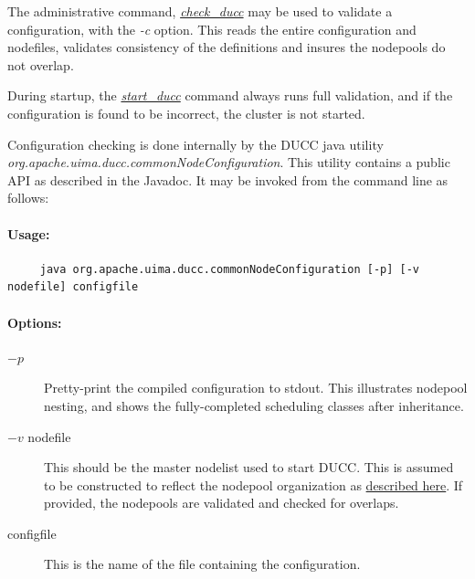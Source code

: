The administrative command, \hyperref[subsec:admin.check-ducc]{\em check\_ducc} may be used to
validate a configuration, with the {\em -c} option.  This reads the entire configuration and
nodefiles, validates consistency of the definitions and insures the nodepools do not overlap.

During startup, the \hyperref[subsec:admin.check-ducc]{\em start\_ducc} command always runs full validation, and if the
configuration is found to be incorrect, the cluster is not started.

Configuration checking is done internally by the DUCC java utility {\em
  org.apache.uima.ducc.commonNodeConfiguration}.  This utility contains a public
API as described in the Javadoc.  It may be invoked from the command line as follows:

    \paragraph{Usage:}
\begin{verbatim}
     java org.apache.uima.ducc.commonNodeConfiguration [-p] [-v nodefile] configfile
\end{verbatim}

    \paragraph{Options:}
    \begin{description}

      \item[$-p$] Pretty-print the compiled configuration to stdout. This illustrates
        nodepool nesting, and shows the fully-completed scheduling classes after inheritance.

      \item[$-v$ nodefile] This should be the master nodelist used to start DUCC.  This
        is assumed to be constructed to reflect the nodepool organization as 
        \hyperref[sec:admin-ducc.nodes]{described here}.  If provided,
        the nodepools are validated and checked for overlaps.

      \item[configfile] This is the name of the file containing the configuration.
    \end{description}
    

